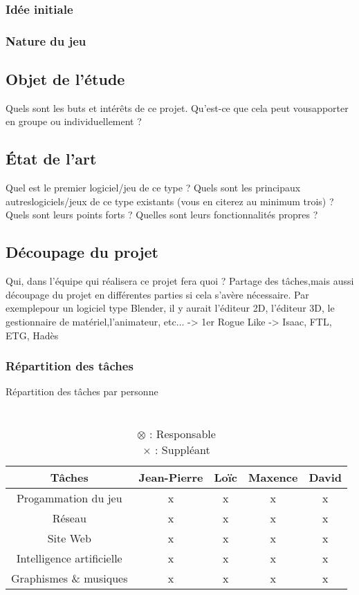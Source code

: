 \documentclass{article}
\begin{document}
\subsubsection{Idée initiale}
\subsubsection{Nature du jeu}

\subsection{Objet de l'étude}
Quels sont les buts et intérêts de ce projet. Qu’est-ce que cela peut vousapporter en groupe ou individuellement ?

\subsection{État de l'art}
Quel est le premier logiciel/jeu de ce type ? Quels sont les principaux autreslogiciels/jeux de ce type existants (vous en citerez au minimum trois) ? Quels sont leurs points forts ? Quelles sont leurs fonctionnalités propres ?

\subsection{Découpage du projet}
Qui, dans l’équipe qui réalisera ce projet fera quoi ? Partage des tâches,mais aussi découpage du projet en différentes parties si cela s’avère nécessaire. Par exemplepour un logiciel type Blender, il y aurait l’éditeur 2D, l’éditeur 3D, le gestionnaire de matériel,l’animateur, etc... \newline
-> 1er Rogue Like \newline
-> Isaac, FTL, ETG, Hadès

\pagebreak

\subsubsection{Répartition des tâches}

\begin{table}[h!]
    \centering
    \caption*{Répartition des tâches par personne}
    \begin{tabular}{ |c|c|c|c|c| } %
        \hline
        Tâches & Jean-Pierre & Loïc & Maxence & David \\
        \hline
        Progammation du jeu & x & x & x & x \\
        \hline
        Réseau & x & x & x & x \\
        \hline
        Site Web & x & x & x & x \\
        \hline
        Intelligence artificielle & x & x & x & x \\
        \hline
        Graphismes \& musiques & x & x & x & x \\
        \hline
    \end{tabular}
    \caption*{
        \\ $\otimes$ : Responsable
        \\ $\times$ : Suppléant
    }
    \label{table:repartition}
\end{table}
\end{document}
